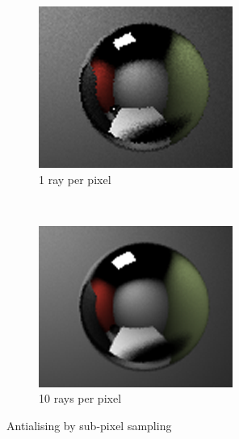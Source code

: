 \documentclass[a4paper, 12pt]{report}
\begin{document}
\begin{figure}
        \centering
        \begin{subfigure}[b]{0.3\textwidth}
                \includegraphics[width=\textwidth]{figures/aliasing_1.png}
                \caption{1 ray per pixel}
                \label{fig:aliasing1}
        \end{subfigure}%
        ~ %
        \begin{subfigure}[b]{0.3\textwidth}
                \includegraphics[width=\textwidth]{figures/aliasing_10.png}
                \caption{10 rays per pixel}
                \label{fig:aliasing10}
        \end{subfigure}
        \caption{Antialising by sub-pixel sampling}\label{fig:antialiasing}
\end{figure}
\end{document}
